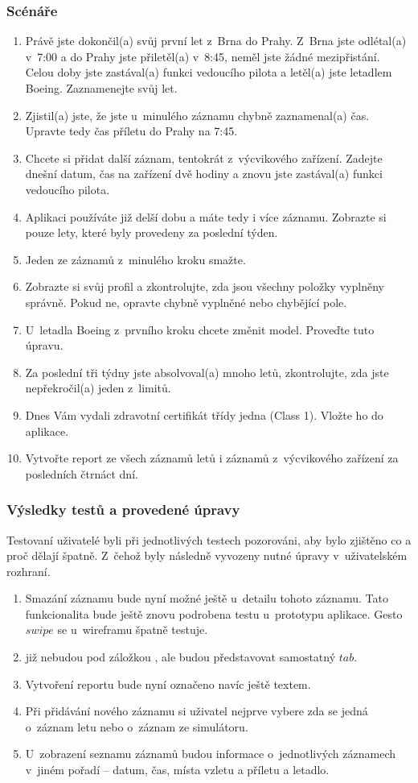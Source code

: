 \documentclass[thesis=M,czech]{FITthesis}[2012/06/26]
\begin{document}
\subsubsection{Scénáře}
\begin{enumerate}
\item Právě jste dokončil(a) svůj první let z~Brna do Prahy. Z~Brna jste odlétal(a) v~7:00 a do Prahy jste přiletěl(a) v~8:45, neměl jste žádné mezipřistání. Celou doby jste zastával(a) funkci vedoucího pilota a letěl(a) jste letadlem Boeing. Zaznamenejte svůj let.
\item Zjistil(a) jste, že jste u~minulého záznamu chybně zaznamenal(a) čas. Upravte tedy čas příletu do Prahy na 7:45.
\item Chcete si přidat další záznam, tentokrát z~výcvikového zařízení. Zadejte dnešní datum, čas na zařízení dvě hodiny a znovu jste zastával(a) funkci vedoucího pilota.
\item Aplikaci používáte již delší dobu a máte tedy i více záznamu. Zobrazte si pouze lety, které byly provedeny za poslední týden.
\item Jeden ze záznamů z~minulého kroku smažte.
\item Zobrazte si svůj profil a zkontrolujte, zda jsou všechny položky vyplněny správně. Pokud ne, opravte chybně vyplněné nebo chybějící pole.
\item U~letadla Boeing z~prvního kroku chcete změnit model. Proveďte tuto úpravu.
\item Za poslední tři týdny jste absolvoval(a) mnoho letů, zkontrolujte, zda jste nepřekročil(a) jeden z~limitů.
\item Dnes Vám vydali zdravotní certifikát třídy jedna (Class 1). Vložte ho do aplikace.
\item Vytvořte report ze všech záznamů letů i záznamů z~výcvikového zařízení za posledních čtrnáct dní.
\end{enumerate}

\subsubsection{Výsledky testů a provedené úpravy}
Testovaní uživatelé byli při jednotlivých testech pozorováni, aby bylo zjištěno co a proč dělají špatně. Z~čehož byly následně vyvozeny nutné úpravy v~uživatelském rozhraní.

\begin{enumerate}
\item Smazání záznamu bude nyní možné ještě u~detailu tohoto záznamu. Tato funkcionalita bude ještě znovu podrobena testu u~prototypu aplikace. Gesto $swipe$ se u~wireframu špatně testuje.
\item {} již nebudou pod záložkou , ale budou představovat samostatný $tab$.
\item Vytvoření reportu bude nyní označeno navíc ještě textem.
\item Při přidávání nového záznamu si uživatel nejprve vybere zda se jedná o~záznam letu nebo o~záznam ze simulátoru.
\item U~zobrazení seznamu záznamů budou informace o~jednotlivých záznamech v~jiném pořadí -- datum, čas, místa vzletu a příletu a letadlo.
\end{enumerate}
\end{document}
